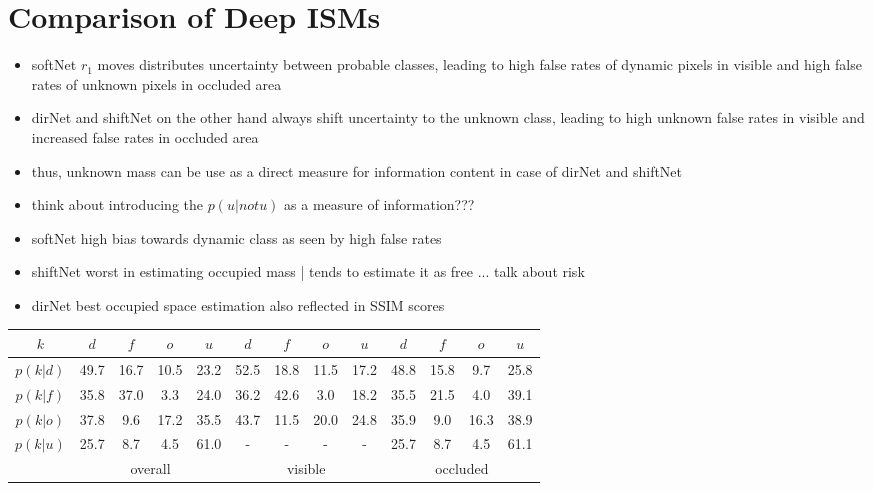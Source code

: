 \section{Comparison of Deep ISMs}
\label{sec:comparison_of_deep_isms}
\begin{itemize}
	\item softNet $r_1$ moves distributes uncertainty between probable classes, leading to high false rates of dynamic pixels in visible and high false rates of unknown pixels in occluded area
	\item dirNet and shiftNet on the other hand always shift uncertainty to the unknown class, leading to high unknown false rates in visible and increased false rates in occluded area
	\item thus, unknown mass can be use as a direct measure for information content in case of dirNet and shiftNet
	\item think about introducing the $p(u|not u)$ as a measure of information???
	\item softNet high bias towards dynamic class as seen by high false rates
	\item shiftNet worst in estimating occupied mass | tends to estimate it as free ... talk about risk
	\item dirNet best occupied space estimation also reflected in SSIM scores
\end{itemize}
\begin{center}
	\footnotesize 
	\begin{tabular}{c|cccc|cccc|cccc}		
		$k$ & $d$ & $f$ & $o$ & $u$ & $d$ & $f$ & $o$ & $u$ & $d$ & $f$ & $o$ & $u$\\
		\hline
		$p(k|d)$ & \textcolor{mygreen}{49.7} & 16.7 & 10.5 & 23.2 & \textcolor{mygreen}{52.5} & 18.8 & 11.5 & 17.2 & \textcolor{mygreen}{48.8} & 15.8 & 9.7 & 25.8\\
		$p(k|f)$ &  35.8 & \textcolor{mygreen}{37.0} & 3.3 & 24.0 & 36.2 & \textcolor{mygreen}{42.6} & 3.0 & 18.2 & 35.5 & \textcolor{mygreen}{21.5} & 4.0 & 39.1\\
		$p(k|o)$ &  37.8 & 9.6 & \textcolor{mygreen}{17.2} & 35.5 & 43.7 & 11.5 & \textcolor{mygreen}{20.0} & 24.8 & 35.9 & 9.0 & \textcolor{mygreen}{16.3} & 38.9\\
		$p(k|u)$ &  25.7 & 8.7 & 4.5 & \textcolor{mygreen}{61.0} & - & - & - & - & 25.7 & 8.7 & 4.5 & \textcolor{mygreen}{61.1} \\
		\hline
		& \multicolumn{4}{c|}{overall} & \multicolumn{4}{c|}{visible} & \multicolumn{4}{c}{occluded}
	\end{tabular}
\end{center}

